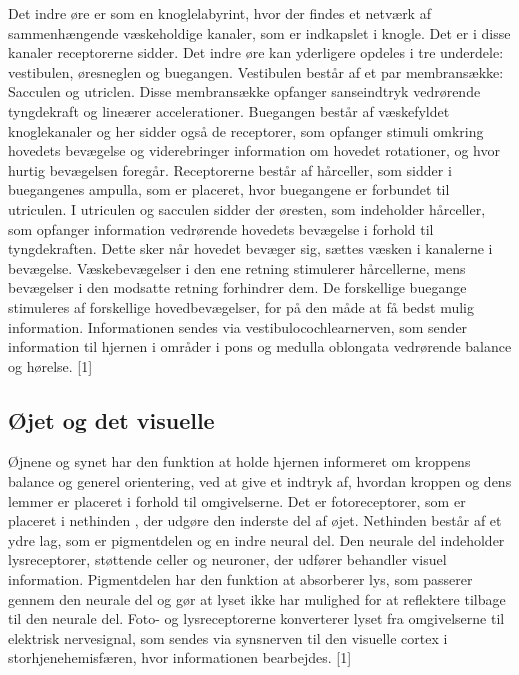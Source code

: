  Det indre øre er som en knoglelabyrint, hvor der findes et netværk af sammenhængende væskeholdige kanaler, som er indkapslet i knogle. Det er i disse kanaler receptorerne sidder. Det indre øre kan yderligere opdeles i tre underdele: vestibulen, øresneglen og buegangen. Vestibulen består af et par membransække: Sacculen og utriclen. Disse membransække opfanger sanseindtryk vedrørende tyngdekraft og lineærer accelerationer.  Buegangen består af væskefyldet knoglekanaler og her sidder også de receptorer, som opfanger stimuli omkring hovedets bevægelse og viderebringer information om hovedet rotationer, og hvor hurtig bevægelsen foregår. Receptorerne består af hårceller, som sidder i buegangenes ampulla, som er placeret, hvor buegangene er forbundet til utriculen. I utriculen og sacculen sidder der øresten, som indeholder hårceller, som opfanger information vedrørende hovedets bevægelse i forhold til tyngdekraften. Dette sker når hovedet bevæger sig, sættes væsken i kanalerne i bevægelse. Væskebevægelser i den ene retning stimulerer hårcellerne, mens bevægelser i den modsatte retning forhindrer dem. De forskellige buegange stimuleres af forskellige hovedbevægelser, for på den måde at få bedst mulig information. Informationen sendes via vestibulocochlearnerven, som sender information til hjernen i områder i pons og medulla oblongata vedrørende balance og hørelse. [1]    


\subsection{Øjet og det visuelle}
Øjnene og synet har den funktion at holde hjernen informeret om kroppens balance og generel orientering, ved at give et indtryk af, hvordan kroppen og dens lemmer er placeret i forhold til omgivelserne. Det er fotoreceptorer, som er placeret i nethinden , der udgøre den inderste del af øjet. Nethinden består af et ydre lag, som er pigmentdelen og en indre neural del. Den neurale del indeholder lysreceptorer, støttende celler og neuroner, der udfører behandler visuel information. Pigmentdelen har den funktion at absorberer lys, som passerer gennem den neurale del og gør at lyset ikke har mulighed for at reflektere tilbage til den neurale del. Foto- og lysreceptorerne konverterer lyset fra omgivelserne til elektrisk nervesignal, som sendes via synsnerven til den visuelle cortex i storhjenehemisfæren, hvor informationen bearbejdes. [1]  

